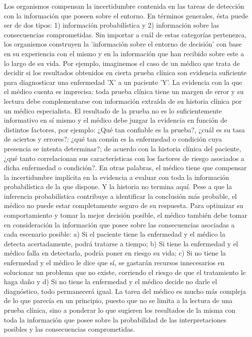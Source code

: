 Los organismos compensan la incertidumbre contenida en las tareas de detección con la información que poseen sobre el entorno. En términos generales, ésta puede ser de dos tipos: 1) información probabilística y 2) información sobre las consecuencias comprometidas. Sin importar a cuál de estas categorías pertenezca, los organismos construyen la 'información sobre el entorno de decisión' con base en su experiencia con el mismo y en la información que han recibido sobre este a lo largo de su vida. Por ejemplo, imaginemos el caso de un médico que trata de decidir si los resultados obtenidos en cierta prueba clínica son evidencia suficiente para diagnosticar una enfermedad 'X' a un paciente 'Y'. La evidencia con la que el médico cuenta es imprecisa: toda prueba clínica tiene un margen de error y su lectura debe complementarse con información extraída de su historia clínica por un médico especialista. El resultado de la prueba no es lo suficientemente informativo en sí mismo y el médico debe juzgar la evidencia en función de distintos factores, por ejemplo: ¿Qué tan confiable es la prueba?, ¿cuál es su tasa de aciertos y errores?; ¿qué tan común es la enfermedad o condición cuya presencia se intenta determinar?; de acuerdo con la historia clínica del paciente, ¿qué tanto correlacionan sus características con los factores de riesgo asociados a dicha enfermedad o condición?. En otras palabras, el médico tiene que compensar la incertidumbre implícita en la evidencia a evaluar con toda la información probabilística de la que dispone. Y la historia no termina aquí.  Pese a que la inferencia probabilística contribuye a identificar la conclusión más probable, el médico no puede estar completamente seguro de su respuesta. Para optimizar su comportamiento y tomar la mejor decisión posible, el médico también debe tomar en consideración la información que posee sobre las consecuencias asociadas a cada escenario posible: a) Si el paciente tiene la enfermedad y el médico la detecta acertadamente, podrá tratarse a tiempo; b) Si tiene la enfermedad y el médico falla en detectarla, podría poner en riesgo su vida; c) Si no tiene la enfermedad y el médico le dice que sí, se gastarán recursos innecesarios en solucionar un problema que no existe, corriendo el riesgo de que el tratamiento le haga daño y d) Si no tiene la enfermedad y el médico decide no darle el diagnóstico, todo permanecerá igual. La tarea del médico es mucho más compleja de lo que parecía en un principio, puesto que no se limita a la lectura de una prueba clínica, sino a ponderar lo que sugieren los resultados de la misma con toda la información que posee sobre la probabilidad de las interpretaciones posibles y las consecuencias comprometidas.\\

